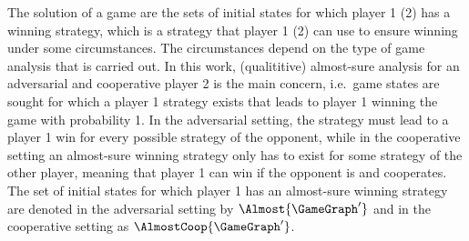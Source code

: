     The solution of a game are the sets of initial states for which player 1 (2) has a winning strategy, which is a strategy that player 1 (2) can use to ensure winning under some circumstances.
    The circumstances depend on the type of game analysis that is carried out.
    In this work, (qualititive) almost-sure analysis for an adversarial and cooperative player 2 is the main concern, i.e.\ game states are sought for which a player 1 strategy exists that leads to player 1 winning the game with probability 1.
    In the adversarial setting, the strategy must lead to a player 1 win for every possible strategy of the opponent, while in the cooperative setting an almost-sure winning strategy only has to exist for some strategy of the other player, meaning that player 1 can win if the opponent is  and cooperates.
    The set of initial states for which player 1 has an almost-sure winning strategy are denoted in the adversarial setting by $\Almost{\GameGraph'}$ and in the cooperative setting as $\AlmostCoop{\GameGraph'}$.

\stopsubsection

